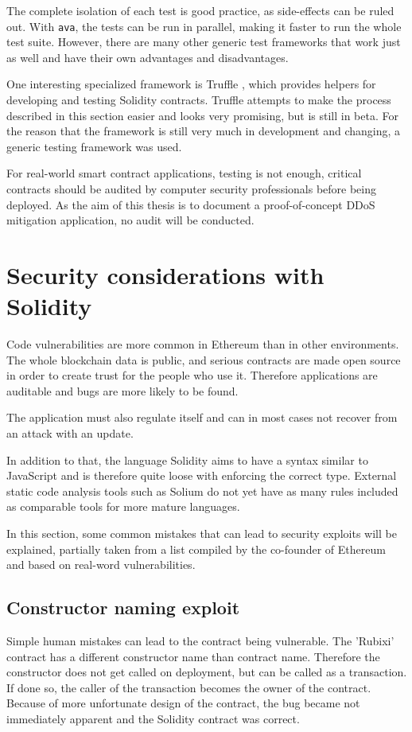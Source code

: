 The complete isolation of each test is good practice, as side-effects can be ruled out. With \texttt{ava}, the tests can be run in parallel, making it faster to run the whole test suite. However, there are many other generic test frameworks that work just as well and have their own advantages and disadvantages.

One interesting specialized framework is Truffle \cite{Truffle}, which provides helpers for developing and testing Solidity contracts. Truffle attempts to make the process described in this section easier and looks very promising, but is still in beta. For the reason that the framework is still very much in development and changing, a generic testing framework was used.

For real-world smart contract applications, testing is not enough, critical contracts should be audited by computer security professionals before being deployed. As the aim of this thesis is to document a proof-of-concept DDoS mitigation application, no audit will be conducted.

\section{Security considerations with Solidity}
Code vulnerabilities are more common in Ethereum than in other environments. The whole blockchain data is public, and serious contracts are made open source in order to create trust for the people who use it. Therefore applications are auditable and bugs are more likely to be found.

The application must also regulate itself and can in most cases not recover from an attack with an update.

In addition to that, the language Solidity aims to have a syntax similar to JavaScript and is therefore quite loose with enforcing the correct type. External static code analysis tools such as Solium \cite{Solium} do not yet have as many rules included as comparable tools for more mature languages.

In this section, some common mistakes that can lead to security exploits will be explained, partially taken from a list compiled by the co-founder of Ethereum \cite{ThinkingAboutSmartContractSecurity} and based on real-word vulnerabilities.

\subsection{Constructor naming exploit}
Simple human mistakes can lead to the contract being vulnerable. The 'Rubixi' contract has a different constructor name than contract name. Therefore the constructor does not get called on deployment, but can be called as a transaction. If done so, the caller of the transaction becomes the owner of the contract. Because of more unfortunate design of the contract, the bug became not immediately apparent and the Solidity contract was correct.

